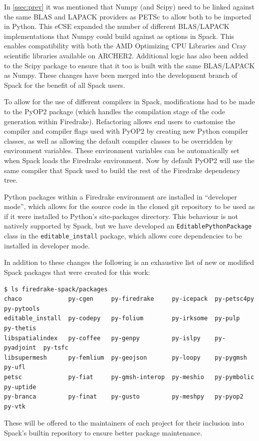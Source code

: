 \documentclass[a4paper,11pt]{article}
\begin{document}
In \cref{ssec:prev} it was mentioned that Numpy (and Scipy) need to be linked against the same BLAS and LAPACK providers as PETSc to allow both to be imported in Python.
This eCSE expanded the number of different BLAS/LAPACK implementations that Numpy could build against as options in Spack.
This enables compatibility with both the AMD Optimizing CPU Libraries and Cray scientific libraries available on ARCHER2.
Additional logic has also been added to the Scipy package to ensure that it too is built with the same BLAS/LAPACK as Numpy.
These changes have been merged into the development branch of Spack for the benefit of all Spack users.

To allow for the use of different compilers in Spack, modifications had to be made to the PyOP2 package (which handles the compilation stage of the code generation within Firedrake).
Refactoring allows end users to customise the compiler and compiler flags used with PyOP2 by creating new Python compiler classes, as well as allowing the default compiler classes to be overridden by environment variables.
These environment variables can be automatically set when Spack loads the Firedrake environment.
Now by default PyOP2 will use the same compiler that Spack used to build the rest of the Firedrake dependency tree.

Python packages within a Firedrake environment are installed in ``developer mode'', which allows for the source code in the cloned git repository to be used as if it were installed to Python's site-packages directory.
This behaviour is not natively supported by Spack, but we have developed an \verb`EditablePythonPackage` class in the \verb`editable_install` package, which allows core dependencies to be installed in developer mode.

In addition to these changes the following is an exhaustive list of new or modified Spack packages that were created for this work:
\begin{lstlisting}
$ ls firedrake-spack/packages
chaco             py-cgen     py-firedrake     py-icepack  py-petsc4py   py-pytools
editable_install  py-codepy   py-folium        py-irksome  py-pulp       py-thetis
libspatialindex   py-coffee   py-genpy         py-islpy    py-pyadjoint  py-tsfc
libsupermesh      py-femlium  py-geojson       py-loopy    py-pygmsh     py-ufl
petsc             py-fiat     py-gmsh-interop  py-meshio   py-pymbolic   py-uptide
py-branca         py-finat    py-gusto         py-meshpy   py-pyop2      py-vtk
\end{lstlisting}
These will be offered to the maintainers of each project for their inclusion into Spack's builtin repository to ensure better package maintenance.
\end{document}

